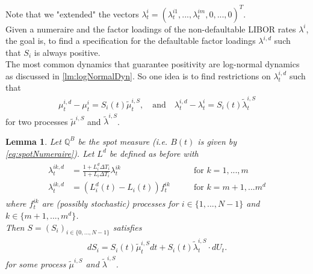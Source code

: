 \documentclass[12pt]{article}
\newtheorem{lemma}[theorem]{Lemma}
\begin{document}
	Note that we "extended" the vectors $\lambda^{i}_t = (\lambda^{i 1}_t, ..., \lambda^{i m}_t, 0, ..., 0)^T$.\\
	Given a numeraire and the factor loadings of the non-defaultable LIBOR rates $\lambda^i$, the goal is, to find a specification for the defaultable factor loadings $\lambda^{i,d}$ such that $S_i$ is always positive.\\
	The most common dynamics that guarantee positivity are log-normal dynamics as discussed in \cref{lm:logNormalDyn}. So one idea is to find restrictions on $\lambda^{i,d}_t$ such that 
	\begin{align*}
		\mu^{i,d}_t - \mu^{i}_t = S_i(t)\tilde{\mu}^{i,S}_t, \quad \text{and} 
		\quad \lambda^{i,d}_t - \lambda^{i}_t = S_i(t)\tilde{\lambda}^{i,S}_t
	\end{align*}
	for two processes $\tilde{\mu}^{i,S}$ and $\tilde{\lambda}^{i,S}$.
	\begin{lemma}\label{lem:flguaranteeingpositivespreads}
		Let $\mathbb{Q}^B$ be the spot measure (i.e. $B(t)$ is given by \cref{eq:spotNumeraire}).
		Let $L^d$ be defined as before with 
		\begin{align}
			\begin{aligned}
				\lambda^{i k,d}_t &= \frac{1+L^d_i\Delta T_i}{1+L_i\Delta T_i} \lambda^{i k}_t \quad \quad & \text{for } k= 1,...,m\\
				\lambda^{i k,d}_t &= \left(L^d_i(t) - L_i(t)\right)f^{i k}_t \quad \quad & \text{for } k= m+1, ... m^d
			\end{aligned}
		\end{align}
		where $f^{i k}_t$ are (possibly stochastic) processes for $i\in\{1, ..., N-1\}$ and $k\in \{m+1, ..., m^d\}$.\\
		Then $S = (S_i)_{i\in \{0, ..., N-1\}}$ satisfies 
		\begin{align*}
			dS_i = S_i(t)\tilde{\mu}^{i,S}_t dt + S_i(t)\tilde{\lambda}^{i,S}_t \cdot dU_t.
		\end{align*}
		for some process $\tilde{\mu}^{i,S}$ and $\tilde{\lambda}^{i,S}$.
	\end{lemma}
\end{document}
